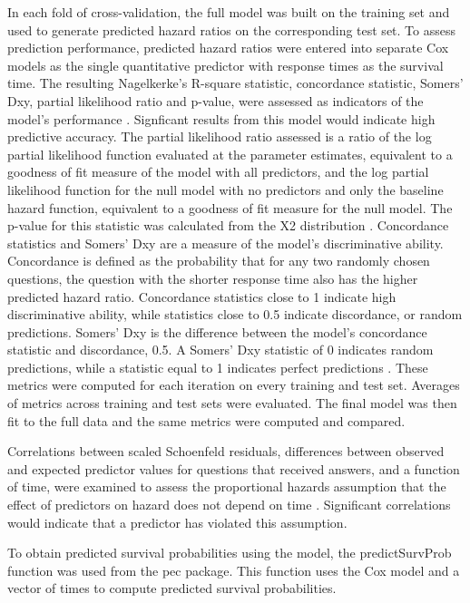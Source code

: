 \documentclass{article}
\begin{document}
In each fold of cross-validation, the full model was built on the training set and used to generate predicted hazard ratios on the corresponding test set. To assess prediction performance, predicted hazard ratios were entered into separate Cox models as the single quantitative predictor with response times as the survival time. The resulting Nagelkerke's R-square statistic, concordance statistic, Somers' Dxy, partial likelihood ratio and p-value, were assessed as indicators of the model's performance \cite{Chen}. Signficant results from this model would indicate high predictive accuracy. The partial likelihood ratio assessed is a ratio of the log partial likelihood function evaluated at the parameter estimates, equivalent to a goodness of fit measure of the model with all predictors, and the log partial likelihood function for the null model with no predictors and only the baseline hazard function, equivalent to a goodness of fit measure for the null model. The p-value for this statistic was calculated from the X2 distribution \cite{find}. Concordance statistics and Somers' Dxy are a measure of the model's discriminative ability. Concordance is defined as the probability that for any two randomly chosen questions, the question with the shorter response time also has the higher predicted hazard ratio. Concordance statistics close to 1 indicate high discriminative ability, while statistics close to 0.5 indicate discordance, or random predictions. Somers' Dxy is the difference between the model's concordance statistic and discordance, 0.5. A Somers' Dxy statistic of 0 indicates random predictions, while a statistic equal to 1 indicates perfect predictions \cite{Harrell2015}. These metrics were computed for each iteration on every training and test set. Averages of metrics across training and test sets were evaluated. The final model was then fit to the full data and the same metrics were computed and compared. 

Correlations between scaled Schoenfeld residuals, differences between observed and expected predictor values for questions that received answers, and a function of time, were examined to assess the proportional hazards assumption that the effect of predictors on hazard does not depend on time \cite{Grambsch1994}. Significant correlations would indicate that a predictor has violated this assumption.

To obtain predicted survival probabilities using the model, the predictSurvProb function was used from the pec package. This function uses the Cox model and a vector of times to compute predicted survival probabilities. 
\end{document}
